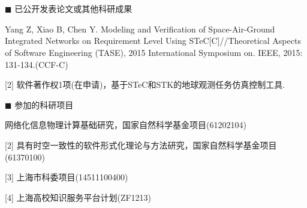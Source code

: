 \newpage
\section*{}
\vskip 5mm



{\heiti $\blacksquare$ 已公开发表论文或其他科研成果}\vskip 5mm
\begin{flushleft}
[1] Yang Z, Xiao B, Chen Y. Modeling and Verification of Space-Air-Ground Integrated Networks on Requirement Level Using STeC[C]//Theoretical Aspects of Software Engineering (TASE), 2015 International Symposium on. IEEE, 2015: 131-134.(CCF-C)

[2] 软件著作权1项(在申请)，基于STeC和STK的地球观测任务仿真控制工具.
\end{flushleft}

{\heiti $\blacksquare$ 参加的科研项目}\vskip 5mm
\begin{flushleft}	
	[1] 网络化信息物理计算基础研究，国家自然科学基金项目(61202104)
	
	
	[2] 具有时空一致性的软件形式化理论与方法研究，国家自然科学基金项目(61370100)
	
	
	[3] 上海市科委项目(14511100400)
 
	
	[4] 上海高校知识服务平台计划(ZF1213)
	
\end{flushleft}